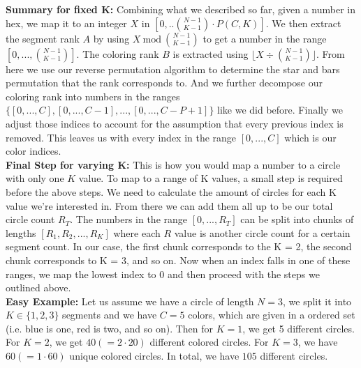 \documentclass[a4paper,12pt]{article}
\begin{document}
\textbf{Summary for fixed K:} Combining what we described so far, given a number in hex, we map it to an integer $X$ in $[0,..{N-1 \choose K-1} \cdot P(C,K)]$. We then extract the segment rank $A$ by using $X \ \text{mod} \ {N-1 \choose K-1}$ to get a number in the range $[0,..., {N-1 \choose K-1}]$. The coloring rank $B$ is extracted using $\lfloor X \div {N-1 \choose K-1} \rfloor $. From here we use our reverse permutation algorithm to determine the star and bars permutation that the rank corresponds to. And we further decompose our coloring rank into numbers in the ranges $\{[0,...,C], [0,...,C-1], ..., [0,...,C - P + 1]\}$ like we did before. Finally we adjust those indices to account for the assumption that every previous index is removed. This leaves us with every index in the range $[0,...,C]$ which is our color indices.\\

\textbf{Final Step for varying K:} This is how you would map a number to a circle with only one $K$ value. To map to a range of K values, a small step is required before the above steps. We need to calculate the amount of circles for each K value we're interested in. From there we can add them all up to be our total circle count $R_T$. The numbers in the range $[0,...,R_T]$ can be split into chunks of lengths $[R_1, R_2, ..., R_K]$ where each $R$ value is another circle count for a certain segment count. In our case, the first chunk corresponds to the K = 2, the second chunk corresponds to K = 3, and so on. Now when an index falls in one of these ranges, we map the lowest index to 0 and then proceed with the steps we outlined above.\\

\textbf{Easy Example:}
Let us assume we have a circle of length $N=3$, we split it into $K \in \{1,2,3\}$ segments and we have $C=5$ colors, which are given in a ordered set (i.e. blue is one, red is two, and so on).
Then for $K=1$, we get 5 different circles.
For $K=2$, we get $ 40 (=2 \cdot 20)$ different colored circles.
For $K=3$, we have $60 (=1 \cdot 60)$ unique colored circles.
In total, we have $105$ different circles.
\end{document}
